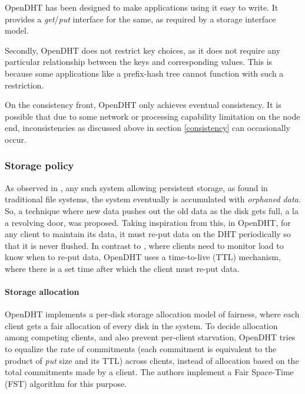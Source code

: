 \documentclass[11pt,a4paper]{article}
\begin{document}
    OpenDHT has been designed to make applications using it easy to write. It provides a \textit{get}/\textit{put} interface for the same, as required by a storage interface model. 
    
    Secondly, OpenDHT does not restrict key choices, as it does not require any particular relationship between the keys and corresponding values. This is because some applications like a prefix-hash tree \cite{PHTRamabhadran} cannot function with such a restriction.
    
    On the consistency front, OpenDHT only achieves eventual consistency. It is possible that due to some network or processing capability limitation on the node end, inconsistencies as discussed above in section \ref{consistency} can occasionally occur.
    
    \subsubsection{Storage policy}
    
    As observed in \cite{PalimpsestRoscoe}, any such system allowing persistent storage, as found in traditional file systems, the system eventually is accumulated with \textit{orphaned data}. So, a technique where new data pushes out the old data as the disk gets full, a la a revolving door, was proposed. \cite{PalimpsestRoscoe} Taking inspiration from this, in OpenDHT, for any client to maintain its data, it must re-put data on the DHT periodically so that it is never flushed. In contrast to \cite{PalimpsestRoscoe}, where clients need to monitor load to know when to re-put data, OpenDHT uses a time-to-live (TTL) mechanism, where there is a set time after which the client must re-put data.
    
    
    \paragraph{Storage allocation} OpenDHT implements a per-disk storage allocation model of fairness, where each client gets a fair allocation of every disk in the system. To decide allocation among competing clients, and also prevent per-client starvation, OpenDHT tries to equalize the rate of commitments (each commitment is equivalent to the product of \textit{put} size and its TTL) across clients, instead of allocation based on the total commitments made by a client. The authors implement a Fair Space-Time (FST) algorithm for this purpose.
    
\end{document}
